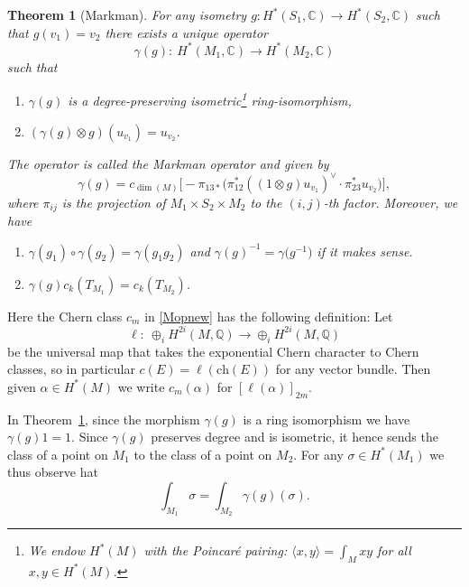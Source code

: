 \documentclass[pdftex]{sigma}
\numberwithin{equation}{section}
\newtheorem{thm}[Theorem]{Theorem}
\newcommand{\BC}{{\mathbb{C}}}
\newcommand{\BQ}{{\mathbb{Q}}}
\newcommand{\ch}{{\mathrm{ch}}}
\newcommand{\1}{\mathsf{1}}
\begin{document}
{\samepage\begin{thm}[Markman] \label{thm:Markman_operator} For any isometry $g\colon H^{\ast}(S_1, \BC) \to H^{\ast}(S_2, \BC)$ such that $g(v_1) = v_2$
there exists a unique operator
\[
\gamma(g)\colon \ H^{\ast}(M_1, \BC) \to H^{\ast}(M_2, \BC)
\]
such that
\begin{enumerate}
\item[$(a)$] $\gamma(g)$ is a degree-preserving isometric\footnote{We endow $H^{\ast}(M)$ with the Poincar\'e pairing: $\langle x,y \rangle = \int_{M} x y$ for all $x,y \in H^{\ast}(M)$.} ring-isomorphism,
\item[$(b)$] $(\gamma(g) \otimes g)(u_{v_1}) = u_{v_2}$.
\end{enumerate}
The operator is called the \emph{Markman operator} and given by
\begin{equation}
\gamma(g) = c_{\dim(M)}\bigl[ - \pi_{13 \ast}\big( \pi_{12}^{\ast} ((1 \otimes g) u_{v_1})^{\vee} \cdot \pi_{23}^{\ast} u_{v_2} \big) \bigr],
\label{Mopnew}
\end{equation}
where $\pi_{ij}$ is the projection of $M_1 \times S_2 \times M_2$ to the $(i,j)$-th factor.
Moreover, we have
\begin{enumerate}
\item[$(c)$] $\gamma(g_1) \circ \gamma(g_2) = \gamma(g_1g_2)$ and $\gamma(g)^{-1} = \gamma\big(g^{-1}\big)$ if it makes sense.
\item[$(d)$] $\gamma(g) c_k(T_{M_1}) = c_k(T_{M_2})$.
\end{enumerate}
\end{thm}}

\begin{rmk} \label{rmk: c applied to coh class}
Here the Chern class $c_m$ in \eqref{Mopnew} has the following definition:
Let
\[
\ell \colon \ \oplus_i H^{2i}(M,\BQ) \to \oplus_i H^{2i}(M,\BQ)
\]
be the universal map that takes the exponential Chern character to Chern classes,
so in particular $c(E) = \ell( \ch(E) )$ for any vector bundle.
Then given $\alpha \in H^{\ast}(M)$ we write $c_m(\alpha)$ for $\left[ \ell(\alpha) \right]_{2m}$.
\end{rmk}

\begin{rmk}
In Theorem~\ref{thm:Markman_operator}, since the morphism $\gamma(g)$ is a ring isomorphism we have $\gamma(g)1 = 1$. Since $\gamma(g)$ preserves degree and is isometric,
it hence sends the class of a point on $M_1$ to the class of a point on $M_2$. For any $\sigma \in H^{\ast}(M_1)$ we thus observe hat
\[ \int_{M_1} \sigma = \int_{M_2} \gamma(g)(\sigma). \]
\end{rmk}
\end{document}

